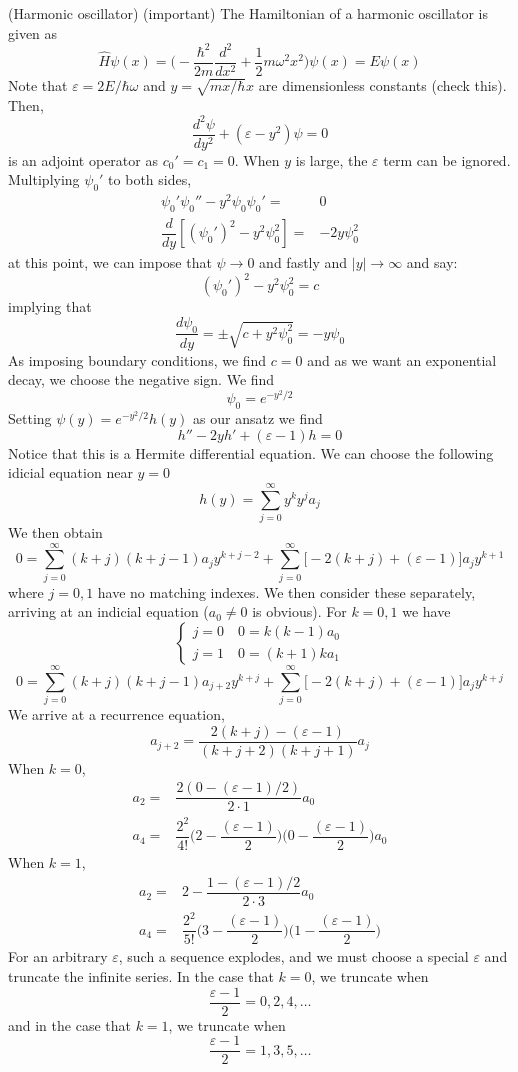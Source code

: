 \vspace{2ex}
\begin{defi}
(Harmonic oscillator) (important) The Hamiltonian of a harmonic oscillator is given as 
\[\hat{H}\psi (x)=\Big(-\dfrac{\hbar ^2}{2m}\dfrac{d ^2}{d x^2}+\dfrac{1}{2}m\omega ^2x^2\Big) \psi (x)=E\psi (x)\]
Note that $\varepsilon =2E/\hbar \omega $ and $y=\sqrt{mx/\hbar }x$ are dimensionless constants (check this). Then,
\[\dfrac{d ^2\psi  }{d y^2}+(\varepsilon -y^2)\psi =0 \]
is an adjoint operator as $c_0'=c_1=0$. When $y$ is large, the $\varepsilon $ term can be ignored. Multiplying $\psi_0 '$ to both sides,
\begin{align*}
\psi_0 '\psi_0 ''-y^2\psi_0 \psi_0 '=&0 \\
\dfrac{d }{d y}[(\psi_0 ')^2-y^2\psi_0 ^2]=&-2y\psi_0 ^2 
\end{align*}
at this point, we can impose that $\psi \rightarrow 0$ and fastly and $|y|\rightarrow \infty $ and say:
\[(\psi_0 ')^2-y^2\psi_0 ^2=c\]
implying that
\[\dfrac{d \psi_0 }{d y}=\pm\sqrt{c+y^2\psi_0 ^2} =-y\psi_0 \]
As imposing boundary conditions, we find $c=0$ and as we want an exponential decay, we choose the negative sign. We find
\[\psi_0=e^{-y^2/2}\]
Setting $\psi (y)=e^{-y^2/2}h(y)$ as our ansatz we find
\[h''-2yh'+(\varepsilon -1)h=0\]
Notice that this is a Hermite differential equation. We can choose the following idicial equation near $y=0$
\[h(y)=\sum ^{\infty }_{j=0}y^{k}y^{j}a_{j}\]
We then obtain
\[0=\sum ^{\infty }_{j=0}(k+j)(k+j-1)a_{j}y^{k+j-2}+\sum ^{\infty }_{j=0}\Big[-2(k+j)+(\varepsilon -1)\Big]a_{j}y^{k+1}\]
where $j=0,1$ have no matching indexes. We then consider these separately, arriving at an indicial equation ($a_0\ne 0$ is obvious). For $k=0,1$ we have
\[\begin{cases}
j=0\quad 0=k(k-1)a_0\\
j=1\quad 0=(k+1)ka_1
\end{cases}\]
\[0=\sum ^{\infty }_{j=0}(k+j)(k+j-1)a_{j+2}y^{k+j}+\sum ^{\infty }_{j=0}\Big[-2(k+j)+(\varepsilon -1)\Big]a_{j}y^{k+j}\]
We arrive at a recurrence equation,
\[a_{j+2}=\dfrac{2(k+j)-(\varepsilon -1)}{(k+j+2)(k+j+1)}a_{j}\]
When $k=0$,
\begin{align*}
a_2=&\dfrac{2(0-(\varepsilon -1)/2)}{2\cdot 1}a_0\\
a_{4}=&\dfrac{2^2}{4!}\Big(2-\dfrac{(\varepsilon -1)}{2}\Big)\Big(0-\dfrac{(\varepsilon -1)}{2}\Big)a_0
\end{align*}
When $k=1$,
\begin{align*}
a_2=&2-\dfrac{1-(\varepsilon -1)/2}{2\cdot 3}a_0\\
a_4=&\dfrac{2^2}{5!}\Big(3-\dfrac{(\varepsilon -1)}{2}\Big)\Big(1-\dfrac{(\varepsilon -1)}{2}\Big)
\end{align*}
For an arbitrary $\varepsilon $, such a sequence explodes, and we must choose a special $\varepsilon $ and truncate the infinite series. In the case that $k=0$, we truncate when
\[\dfrac{\varepsilon -1}{2}=0,2,4,\ldots \]
and in the case that $k=1$, we truncate when 
\[\dfrac{\varepsilon -1}{2}=1,3,5,\ldots \]
\end{defi}
\vspace{2ex}

